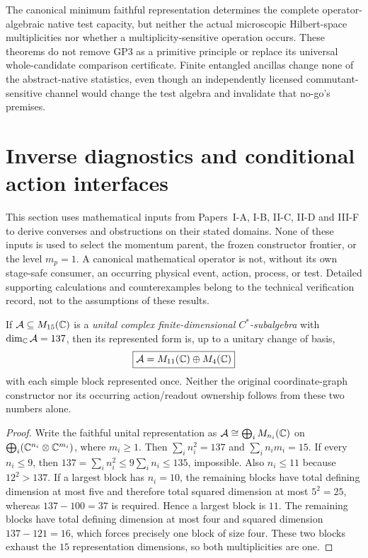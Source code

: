 \documentclass[12pt,a4paper]{article}
\begin{document}
\begin{remark}
\label{p2b:rem:v355-native-operation-firewall}
The canonical minimum faithful representation determines the complete
operator-algebraic native test capacity, but neither the actual microscopic
Hilbert-space multiplicities nor whether a multiplicity-sensitive operation
occurs. These theorems do not remove GP3 as a primitive principle or replace
its universal whole-candidate comparison certificate. Finite entangled
ancillas change none of the abstract-native statistics, even though an
independently licensed commutant-sensitive channel would change the test
algebra and invalidate that no-go's premises.
\end{remark}

\section{Inverse diagnostics and conditional action interfaces}
\label{p2b:sec:v264-reverse-certificates}
\noindent
This section uses mathematical inputs from Papers~I-A, I-B, II-C, II-D
and III-F to derive converses and obstructions on their stated domains.
None of these inputs is used to select the momentum
parent, the frozen constructor frontier, or the level $m_p=1$.
A canonical mathematical operator is not, without its own stage-safe
consumer, an occurring physical event, action, process, or test.
Detailed supporting calculations and counterexamples belong to the
technical verification record, not to the assumptions of these results.

\begin{theorem}
\label{p2b:thm:v264-algebra-rigidity}
If $\mathcal A\subseteq M_{15}(\mathbb{C})$ is a \emph{unital complex
finite-dimensional $C^*$-subalgebra} with
$\dim_{\mathbb{C}}\mathcal A=137$, then its represented form is, up to a
unitary change of basis,
\[
 \boxed{\mathcal A=M_{11}(\mathbb{C})\oplus M_4(\mathbb{C})}
\]
with each simple block represented once.  Neither the original
coordinate-graph constructor nor its occurring action/readout ownership
follows from these two numbers alone.
\end{theorem}
\begin{proof}
Write the faithful unital representation as
$\mathcal A\cong\bigoplus_i M_{n_i}(\mathbb{C})$ on
$\bigoplus_i(\mathbb{C}^{n_i}\otimes\mathbb{C}^{m_i})$, where $m_i\ge1$.
Then $\sum_i n_i^2=137$ and $\sum_i n_im_i=15$.
If every $n_i\le9$, then
$137=\sum_i n_i^2\le9\sum_i n_i\le135$, impossible.
Also $n_i\le11$ because $12^2>137$. If a largest block has
$n_i=10$, the remaining blocks have total defining dimension at most
five and therefore total squared dimension at most $5^2=25$, whereas
$137-100=37$ is required. Hence a largest block is $11$.
The remaining blocks have total defining dimension at most four and
squared dimension $137-121=16$, which forces precisely one block of
size four. These two blocks exhaust the $15$ representation dimensions,
so both multiplicities are one.
\end{proof}
\end{document}
